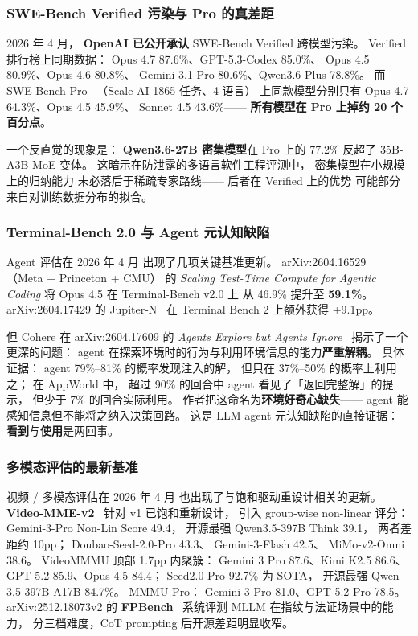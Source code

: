 \subsubsection{SWE-Bench Verified 污染与 Pro 的真差距}
\label{subsec:swebench-pro-2026}

2026 年 4 月，
\textbf{OpenAI 已公开承认}
SWE-Bench Verified 跨模型污染。
Verified 排行榜上同期数据：
Opus 4.7 87.6\%、GPT-5.3-Codex 85.0\%、
Opus 4.5 80.9\%、Opus 4.6 80.8\%、
Gemini 3.1 Pro 80.6\%、Qwen3.6 Plus 78.8\%。
而 SWE-Bench Pro~\cite{swebenchpro2026}
（Scale AI 1865 任务、4 语言）
上同款模型分别只有
Opus 4.7 64.3\%、Opus 4.5 45.9\%、
Sonnet 4.5 43.6\%——
\textbf{所有模型在 Pro 上掉约 20 个百分点}。

一个反直觉的现象是：
\textbf{Qwen3.6-27B 密集模型}在 Pro 上的 77.2\%
反超了 35B-A3B MoE 变体。
这暗示在防泄露的多语言软件工程评测中，
密集模型在小规模上的归纳能力
未必落后于稀疏专家路线——
后者在 Verified 上的优势
可能部分来自对训练数据分布的拟合。

\subsubsection{Terminal-Bench 2.0 与 Agent 元认知缺陷}

Agent 评估在 2026 年 4 月
出现了几项关键基准更新。
arXiv:2604.16529~\cite{terminalbench2_2604}
（Meta + Princeton + CMU）
的 \emph{Scaling Test-Time Compute for Agentic Coding}
将 Opus 4.5 在 Terminal-Bench v2.0 上
从 46.9\% 提升至 \textbf{59.1\%}。
arXiv:2604.17429 的 Jupiter-N~\cite{jupitern2604}
在 Terminal Bench 2 上额外获得 +9.1pp。

但 Cohere 在 arXiv:2604.17609 的
\emph{Agents Explore but Agents Ignore}~\cite{cohereexploreignore2604}
揭示了一个更深的问题：
agent 在探索环境时的行为与利用环境信息的能力\textbf{严重解耦}。
具体证据：
agent 79\%--81\% 的概率发现注入的解，
但只在 37\%--50\% 的概率上利用之；
在 AppWorld 中，
超过 90\% 的回合中 agent
看见了「返回完整解」的提示，
但少于 7\% 的回合实际利用。
作者把这命名为\textbf{环境好奇心缺失}——
agent 能感知信息但不能将之纳入决策回路。
这是 LLM agent 元认知缺陷的直接证据：
\textbf{看到}与\textbf{使用}是两回事。

\subsubsection{多模态评估的最新基准}

视频 / 多模态评估在 2026 年 4 月
也出现了与饱和驱动重设计相关的更新。
\textbf{Video-MME-v2}~\cite{videommev2_2026}
针对 v1 已饱和重新设计，
引入 group-wise non-linear 评分：
Gemini-3-Pro Non-Lin Score 49.4，
开源最强 Qwen3.5-397B Think 39.1，
两者差距约 10pp；
Doubao-Seed-2.0-Pro 43.3、
Gemini-3-Flash 42.5、
MiMo-v2-Omni 38.6。
VideoMMMU 顶部 1.7pp 内聚簇：
Gemini 3 Pro 87.6、Kimi K2.5 86.6、
GPT-5.2 85.9、Opus 4.5 84.4；
Seed2.0 Pro 92.7\% 为 SOTA，
开源最强 Qwen 3.5 397B-A17B 84.7\%。
MMMU-Pro：
Gemini 3 Pro 81.0、GPT-5.2 Pro 78.5。
arXiv:2512.18073v2 的 \textbf{FPBench}~\cite{fpbench2512}
系统评测 MLLM 在指纹与法证场景中的能力，
分三档难度，CoT prompting 后开源差距明显收窄。

